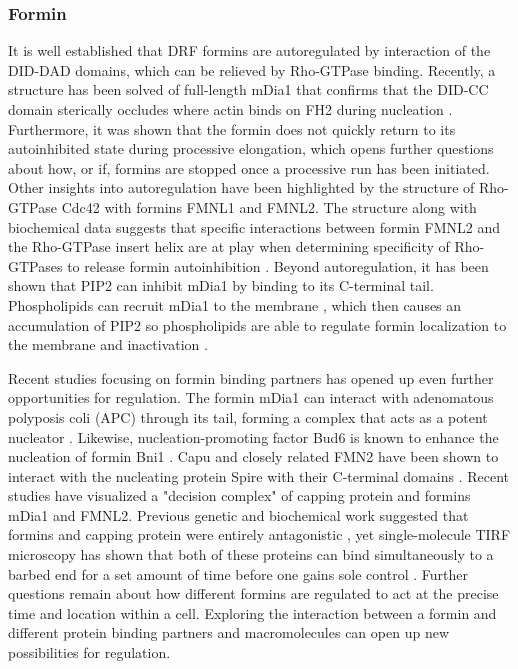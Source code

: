 \subsubsection{Formin}
It is well established that DRF formins are autoregulated by interaction of the DID-DAD domains, which can be relieved by Rho-GTPase binding. Recently, a structure has been solved of full-length mDia1 that confirms that the DID-CC domain sterically occludes where actin binds on FH2 during nucleation \citep{maiti_structure_2012}. Furthermore, it was shown that the formin does not quickly return to its autoinhibited state during processive elongation, which opens further questions about how, or if, formins are stopped once a processive run has been initiated. Other insights into autoregulation have been highlighted by the structure of Rho-GTPase Cdc42 with formins FMNL1 and FMNL2. The structure along with biochemical data suggests that specific interactions between formin FMNL2 and the Rho-GTPase insert helix are at play when determining specificity of Rho-GTPases to release formin autoinhibition \citep{kuhn_structure_2015}. Beyond autoregulation, it has been shown that PIP2 can inhibit mDia1 by binding to its C-terminal tail. Phospholipids can recruit mDia1 to the membrane \citep{van_gisbergen_class_2012}, which then causes an accumulation of PIP2 so phospholipids are able to regulate formin localization to the membrane and inactivation \citep{ramalingam_phospholipids_2010}. 

Recent studies focusing on formin binding partners has opened up even further opportunities for regulation. The formin mDia1 can interact with adenomatous polyposis coli (APC) through its tail, forming a complex that acts as a potent nucleator \citep{breitsprecher_rocket_2012,okada_adenomatous_2010}. Likewise, nucleation-promoting factor Bud6 is known to enhance the nucleation of formin Bni1 \citep{moseley_differential_2005}. Capu and closely related FMN2 have been shown to interact with the nucleating protein Spire with their C-terminal domains \citep{montaville_role_2016,montaville_spire_2014, pechlivanis_identification_2009,vizcarra_structure_2011}. Recent studies have visualized a "decision complex" of capping protein and formins mDia1 and FMNL2. Previous genetic and biochemical work suggested that formins and capping protein were entirely antagonistic \citep{kovar_profilin-mediated_2005}, yet single-molecule TIRF microscopy has shown that both of these proteins can bind simultaneously to a barbed end for a set amount of time before one gains sole control \citep{bombardier_single-molecule_2015,shekhar_formin_2015}. Further questions remain about how different formins are regulated to act at the precise time and location within a cell. Exploring the interaction between a formin and different protein binding partners and macromolecules can open up new possibilities for regulation.


